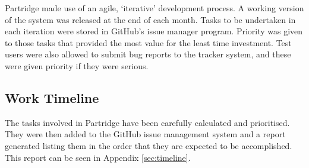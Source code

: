 Partridge made use of an agile, `iterative' development process. A working
version of the system was released at the end of each month. Tasks to be
undertaken in each iteration were stored in GitHub's issue manager program.
Priority was given to those tasks that provided the most value for the least
time investment. Test users were also allowed to submit bug reports to the
tracker system, and these were given priority if they were serious. 


\subsection{ Work Timeline }

The tasks involved in Partridge have been carefully calculated and prioritised.
They were then added to the GitHub issue management system and a report
generated listing them in the order that they are expected to be
accomplished. This report can be seen in Appendix \ref{sec:timeline}. 



